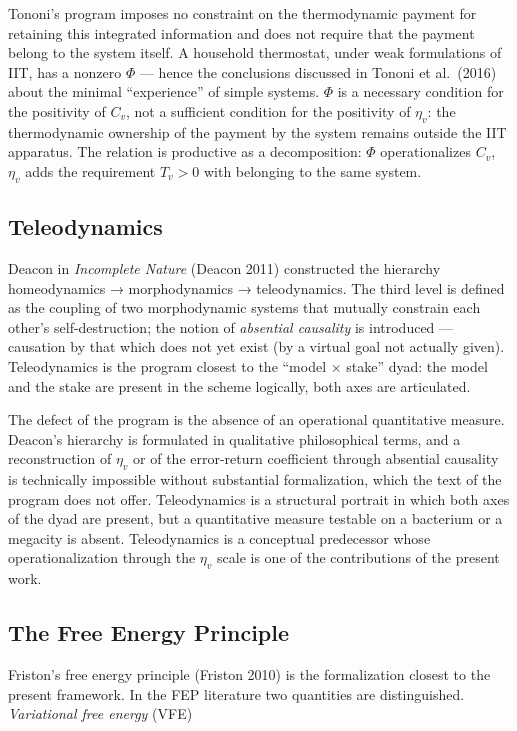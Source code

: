 \documentclass[pdflatex,sn-mathphys-ay]{sn-jnl}
\begin{document}
Tononi's program imposes no constraint on the thermodynamic payment for retaining this integrated information and does not require that the payment belong to the system itself. A household thermostat, under weak formulations of IIT, has a nonzero \(\Phi\) --- hence the conclusions discussed in Tononi et al.~(2016) about the minimal ``experience'' of simple systems. \(\Phi\) is a necessary condition for the positivity of \(C_v\), not a sufficient condition for the positivity of \(\eta_v\): the thermodynamic ownership of the payment by the system remains outside the IIT apparatus. The relation is productive as a decomposition: \(\Phi\) operationalizes \(C_v\), \(\eta_v\) adds the requirement \(T_v > 0\) with belonging to the same system.

\subsection{Teleodynamics}\label{teleodynamics}

Deacon in \emph{Incomplete Nature} (Deacon 2011) constructed the hierarchy homeodynamics → morphodynamics → teleodynamics. The third level is defined as the coupling of two morphodynamic systems that mutually constrain each other's self-destruction; the notion of \emph{absential causality} is introduced --- causation by that which does not yet exist (by a virtual goal not actually given). Teleodynamics is the program closest to the ``model × stake'' dyad: the model and the stake are present in the scheme logically, both axes are articulated.

The defect of the program is the absence of an operational quantitative measure. Deacon's hierarchy is formulated in qualitative philosophical terms, and a reconstruction of \(\eta_v\) or of the error-return coefficient through absential causality is technically impossible without substantial formalization, which the text of the program does not offer. Teleodynamics is a structural portrait in which both axes of the dyad are present, but a quantitative measure testable on a bacterium or a megacity is absent. Teleodynamics is a conceptual predecessor whose operationalization through the \(\eta_v\) scale is one of the contributions of the present work.

\subsection{The Free Energy Principle}\label{the-free-energy-principle}

Friston's free energy principle (Friston 2010) is the formalization closest to the present framework. In the FEP literature two quantities are distinguished. \emph{Variational free energy} (VFE)
\end{document}
